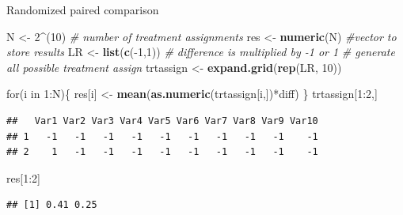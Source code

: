 \documentclass[9pt,ignorenonframetext,]{beamer}
\newenvironment{Shaded}{\begin{snugshade}}{\end{snugshade}}
\newcommand{\KeywordTok}[1]{\textcolor[rgb]{0.13,0.29,0.53}{\textbf{{#1}}}}
\newcommand{\DecValTok}[1]{\textcolor[rgb]{0.00,0.00,0.81}{{#1}}}
\newcommand{\StringTok}[1]{\textcolor[rgb]{0.31,0.60,0.02}{{#1}}}
\newcommand{\CommentTok}[1]{\textcolor[rgb]{0.56,0.35,0.01}{\textit{{#1}}}}
\newcommand{\NormalTok}[1]{{#1}}
\begin{document}
\begin{frame}[fragile]{Randomized paired comparison}

\begin{Shaded}
\begin{Highlighting}[]
\NormalTok{N <-}\StringTok{ }\DecValTok{2}\NormalTok{^(}\DecValTok{10}\NormalTok{) }\CommentTok{# number of treatment assignments}
\NormalTok{res <-}\StringTok{ }\KeywordTok{numeric}\NormalTok{(N) }\CommentTok{#vector to store results}
\NormalTok{LR <-}\StringTok{ }\KeywordTok{list}\NormalTok{(}\KeywordTok{c}\NormalTok{(-}\DecValTok{1}\NormalTok{,}\DecValTok{1}\NormalTok{)) }\CommentTok{# difference is multiplied by -1 or 1}
\CommentTok{# generate all possible treatment assign}
\NormalTok{trtassign <-}\StringTok{ }\KeywordTok{expand.grid}\NormalTok{(}\KeywordTok{rep}\NormalTok{(LR, }\DecValTok{10}\NormalTok{)) }

\NormalTok{for(i in }\DecValTok{1}\NormalTok{:N)\{}
\NormalTok{res[i] <-}\StringTok{ }\KeywordTok{mean}\NormalTok{(}\KeywordTok{as.numeric}\NormalTok{(trtassign[i,])*diff)}
\NormalTok{\}}
\NormalTok{trtassign[}\DecValTok{1}\NormalTok{:}\DecValTok{2}\NormalTok{,]}
\end{Highlighting}
\end{Shaded}

\begin{verbatim}
##   Var1 Var2 Var3 Var4 Var5 Var6 Var7 Var8 Var9 Var10
## 1   -1   -1   -1   -1   -1   -1   -1   -1   -1    -1
## 2    1   -1   -1   -1   -1   -1   -1   -1   -1    -1
\end{verbatim}

\begin{Shaded}
\begin{Highlighting}[]
\NormalTok{res[}\DecValTok{1}\NormalTok{:}\DecValTok{2}\NormalTok{]}
\end{Highlighting}
\end{Shaded}

\begin{verbatim}
## [1] 0.41 0.25
\end{verbatim}

\end{frame}
\end{document}
